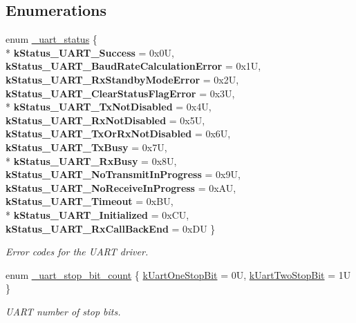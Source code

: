 \subsection*{Enumerations}
\begin{DoxyCompactItemize}
\item 
enum \hyperlink{group__uart__hal_gacef40dc8e8ac174bfe40ebcbc980f84b}{\+\_\+uart\+\_\+status} \{ \\*
{\bfseries k\+Status\+\_\+\+U\+A\+R\+T\+\_\+\+Success} = 0x0U, 
{\bfseries k\+Status\+\_\+\+U\+A\+R\+T\+\_\+\+Baud\+Rate\+Calculation\+Error} = 0x1U, 
{\bfseries k\+Status\+\_\+\+U\+A\+R\+T\+\_\+\+Rx\+Standby\+Mode\+Error} = 0x2U, 
{\bfseries k\+Status\+\_\+\+U\+A\+R\+T\+\_\+\+Clear\+Status\+Flag\+Error} = 0x3U, 
\\*
{\bfseries k\+Status\+\_\+\+U\+A\+R\+T\+\_\+\+Tx\+Not\+Disabled} = 0x4U, 
{\bfseries k\+Status\+\_\+\+U\+A\+R\+T\+\_\+\+Rx\+Not\+Disabled} = 0x5U, 
{\bfseries k\+Status\+\_\+\+U\+A\+R\+T\+\_\+\+Tx\+Or\+Rx\+Not\+Disabled} = 0x6U, 
{\bfseries k\+Status\+\_\+\+U\+A\+R\+T\+\_\+\+Tx\+Busy} = 0x7U, 
\\*
{\bfseries k\+Status\+\_\+\+U\+A\+R\+T\+\_\+\+Rx\+Busy} = 0x8U, 
{\bfseries k\+Status\+\_\+\+U\+A\+R\+T\+\_\+\+No\+Transmit\+In\+Progress} = 0x9U, 
{\bfseries k\+Status\+\_\+\+U\+A\+R\+T\+\_\+\+No\+Receive\+In\+Progress} = 0x\+AU, 
{\bfseries k\+Status\+\_\+\+U\+A\+R\+T\+\_\+\+Timeout} = 0x\+BU, 
\\*
{\bfseries k\+Status\+\_\+\+U\+A\+R\+T\+\_\+\+Initialized} = 0x\+CU, 
{\bfseries k\+Status\+\_\+\+U\+A\+R\+T\+\_\+\+Rx\+Call\+Back\+End} = 0x\+DU
 \}\hypertarget{group__uart__hal_gacef40dc8e8ac174bfe40ebcbc980f84b}{}\label{group__uart__hal_gacef40dc8e8ac174bfe40ebcbc980f84b}
\begin{DoxyCompactList}\small\item\em Error codes for the U\+A\+RT driver. \end{DoxyCompactList}
\item 
enum \hyperlink{group__uart__hal_ga3c656a4365cab1185398ff953272091e}{\+\_\+uart\+\_\+stop\+\_\+bit\+\_\+count} \{ \hyperlink{group__uart__hal_gga3c656a4365cab1185398ff953272091ea792ceeb3ebaaf5b2529423fe8e178d44}{k\+Uart\+One\+Stop\+Bit} = 0U, 
\hyperlink{group__uart__hal_gga3c656a4365cab1185398ff953272091ea27898a03ccf45fe91fddfff83be60cea}{k\+Uart\+Two\+Stop\+Bit} = 1U
 \}\begin{DoxyCompactList}\small\item\em U\+A\+RT number of stop bits. \end{DoxyCompactList}

\end{DoxyCompactItemize}
